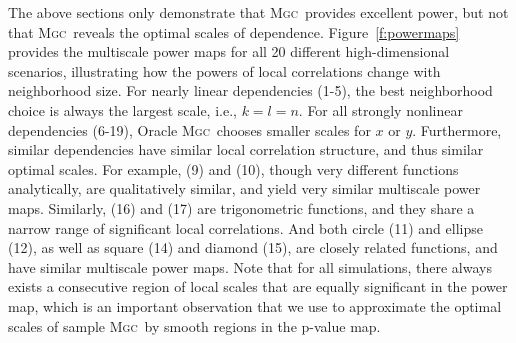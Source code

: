 \documentclass[11pt]{article}
\providecommand{\sct}[1]{{\normalfont\textsc{#1}}}
\newcommand{\Mgc}{\sct{Mgc}}
\begin{document}
The above sections only demonstrate that \Mgc~provides excellent power, but not that \Mgc~reveals the optimal scales of dependence. 
Figure~\ref{f:powermaps} provides the multiscale power maps for all 20 different high-dimensional scenarios, illustrating how the powers of local correlations change with  neighborhood size.
% 
For nearly linear dependencies (1-5), the best neighborhood choice is always the largest scale, i.e., $k=l=n$. For all strongly nonlinear dependencies (6-19), Oracle \Mgc~chooses smaller scales for $x$ or $y$.
Furthermore, similar dependencies have similar local correlation structure, and thus similar optimal scales. For example, (9) and (10), though very different functions analytically, are qualitatively similar, and yield very similar multiscale power maps.
Similarly,  (16) and (17) are trigonometric functions, and they share a narrow range of significant local correlations.
And both circle (11) and ellipse (12), as well as square (14) and diamond (15), are closely related functions, and have similar multiscale power maps.
% 
Note that for all simulations, there always exists a consecutive region of local scales that are equally significant in the power map, which is an important observation that we use to approximate the optimal scales of sample \Mgc~by smooth regions in the p-value map.
\end{document}
